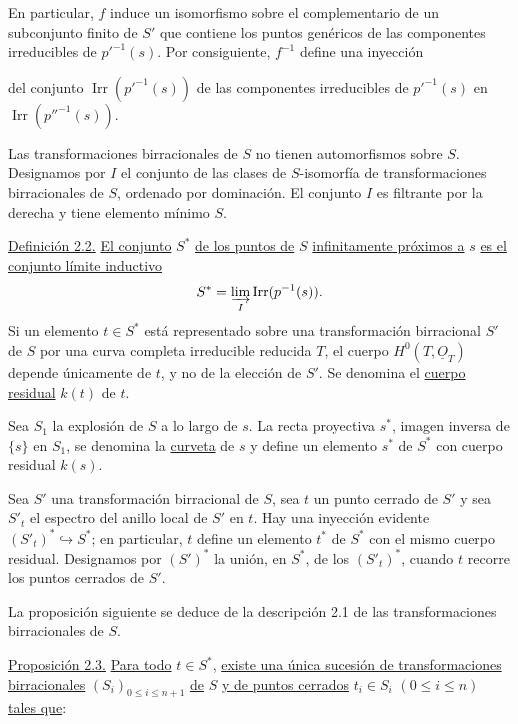 En particular, $f$ induce un isomorfismo sobre el complementario de un
subconjunto finito de $S'$ que contiene los puntos genéricos de las componentes
irreducibles de $p'^{-1}(s)$. Por consiguiente, $f^{-1}$ define una inyección

\pageoriginale

del conjunto $\operatorname{Irr}(p'^{-1}(s))$ de las componentes irreducibles de
$p'^{-1}(s)$ en $\operatorname{Irr}(p''^{-1}(s))$.

Las transformaciones birracionales de $S$ no tienen automorfismos sobre $S$.
Designamos por $I$ el conjunto de las clases de $S$-isomorfía de transformaciones
birracionales de $S$, ordenado por dominación. El conjunto $I$ es filtrante por
la derecha y tiene elemento mínimo $S$.

\medskip
\noindent\underline{Definición 2.2.}
\underline{El conjunto} $S^*$ \underline{de los puntos de} $S$
\underline{infinitamente próximos a} $s$ \underline{es el conjunto límite
inductivo}
\begin{equation*}
S^*=\varinjlim_I\operatorname{Irr}(p^{-1}(s)).
\end{equation*}
Si un elemento $t\in S^*$ está representado sobre una transformación
birracional $S'$ de $S$ por una curva completa irreducible reducida $T$, el
cuerpo $H^0(T,\underline{O}_T)$ depende únicamente de $t$, y no de la elección
de $S'$. Se denomina el \underline{cuerpo residual} $k(t)$ de $t$.

Sea $S_1$ la explosión de $S$ a lo largo de $s$. La recta proyectiva $s^*$,
imagen inversa de $\{s\}$ en $S_1$, se denomina la \underline{curveta} de $s$ y
define un elemento $s^*$ de $S^*$ con cuerpo residual $k(s)$.

Sea $S'$ una transformación birracional de $S$, sea $t$ un punto cerrado de
$S'$ y sea $S'_t$ el espectro del anillo local de $S'$ en $t$. Hay una inyección
evidente $(S'_t)^*\hookrightarrow S^*$; en particular, $t$ define un elemento
$t^*$ de $S^*$ con el mismo cuerpo residual. Designamos por $(S')^*$ la unión,
en $S^*$, de los $(S'_t)^*$, cuando $t$ recorre los puntos cerrados de $S'$.

La proposición siguiente se deduce de la descripción 2.1 de las transformaciones
birracionales de $S$.

\pageoriginale

\medskip
\noindent\underline{Proposición 2.3.}
\underline{Para todo} $t\in S^*$, \underline{existe una única sucesión de
transformaciones birracionales} $(S_i)_{0\leq i\leq n+1}$ \underline{de} $S$
\underline{y de puntos cerrados} $t_i\in S_i$ $(0\leq i\leq n)$
\underline{tales que}:


